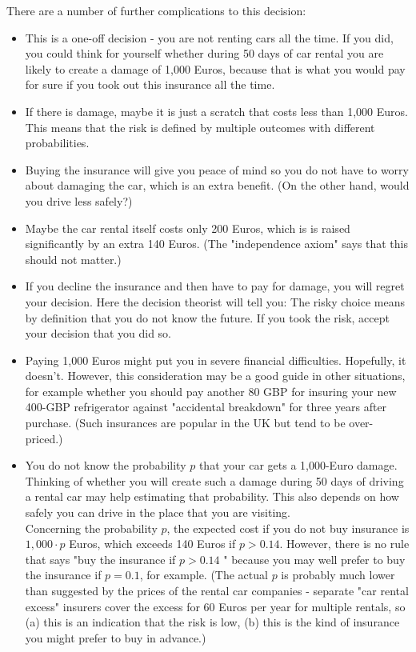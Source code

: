\documentclass[12pt]{article}
\begin{document}
There are a number of further complications to this decision:

\begin{itemize}
  \item This is a one-off decision - you are not renting cars all the time. If you did, you could think for yourself whether during 50 days of car rental you are likely to create a damage of 1,000 Euros, because that is what you would pay for sure if you took out this insurance all the time.
  \item If there is damage, maybe it is just a scratch that costs less than 1,000 Euros. This means that the risk is defined by multiple outcomes with different probabilities.
  \item Buying the insurance will give you peace of mind so you do not have to worry about damaging the car, which is an extra benefit. (On the other hand, would you drive less safely?)
  \item Maybe the car rental itself costs only 200 Euros, which is is raised significantly by an extra 140 Euros. (The "independence axiom" says that this should not matter.)
  \item If you decline the insurance and then have to pay for damage, you will regret your decision. Here the decision theorist will tell you: The risky choice means by definition that you do not know the future. If you took the risk, accept your decision that you did so.
  \item Paying 1,000 Euros might put you in severe financial difficulties. Hopefully, it doesn't. However, this consideration may be a good guide in other situations, for example whether you should pay another 80 GBP for insuring your new 400-GBP refrigerator against "accidental breakdown" for three years after purchase. (Such insurances are popular in the UK but tend to be over-priced.)
  \item You do not know the probability $p$ that your car gets a 1,000-Euro damage. Thinking of whether you will create such a damage during 50 days of driving a rental car may help estimating that probability. This also depends on how safely you can drive in the place that you are visiting.\\
Concerning the probability $p$, the expected cost if you do not buy insurance is $1,000 \cdot p$ Euros, which exceeds 140 Euros if $p>0.14$. However, there is no rule that says "buy the insurance if $p>0.14$ " because you may well prefer to buy the insurance if $p=0.1$, for example. (The actual $p$ is probably much lower than suggested by the prices of the rental car companies - separate "car rental excess" insurers cover the excess for 60 Euros per year for multiple rentals, so (a) this is an indication that the risk is low, (b) this is the kind of insurance you might prefer to buy in advance.)
\end{itemize}
\end{document}
